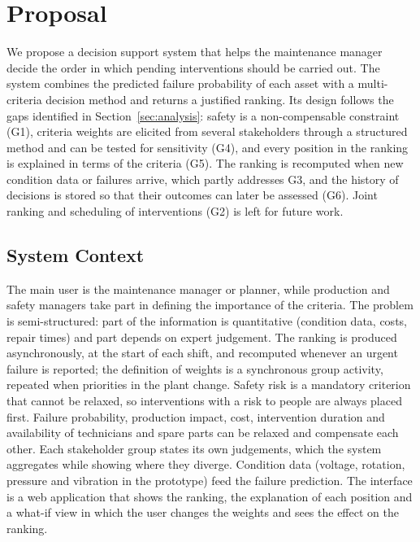 \section{Proposal}
\label{sec:proposta}

We propose a decision support system that helps the maintenance manager decide the order in which pending interventions should be carried out. The system combines the predicted failure probability of each asset with a multi-criteria decision method and returns a justified ranking. Its design follows the gaps identified in Section~\ref{sec:analysis}: safety is a non-compensable constraint (G1), criteria weights are elicited from several stakeholders through a structured method and can be tested for sensitivity (G4), and every position in the ranking is explained in terms of the criteria (G5). The ranking is recomputed when new condition data or failures arrive, which partly addresses G3, and the history of decisions is stored so that their outcomes can later be assessed (G6). Joint ranking and scheduling of interventions (G2) is left for future work.

\subsection{System Context}
\label{sec:context}

The main user is the maintenance manager or planner, while production and safety managers take part in defining the importance of the criteria. The problem is semi-structured: part of the information is quantitative (condition data, costs, repair times) and part depends on expert judgement. The ranking is produced asynchronously, at the start of each shift, and recomputed whenever an urgent failure is reported; the definition of weights is a synchronous group activity, repeated when priorities in the plant change. Safety risk is a mandatory criterion that cannot be relaxed, so interventions with a risk to people are always placed first. Failure probability, production impact, cost, intervention duration and availability of technicians and spare parts can be relaxed and compensate each other. Each stakeholder group states its own judgements, which the system aggregates while showing where they diverge. Condition data (voltage, rotation, pressure and vibration in the prototype) feed the failure prediction. The interface is a web application that shows the ranking, the explanation of each position and a what-if view in which the user changes the weights and sees the effect on the ranking.

